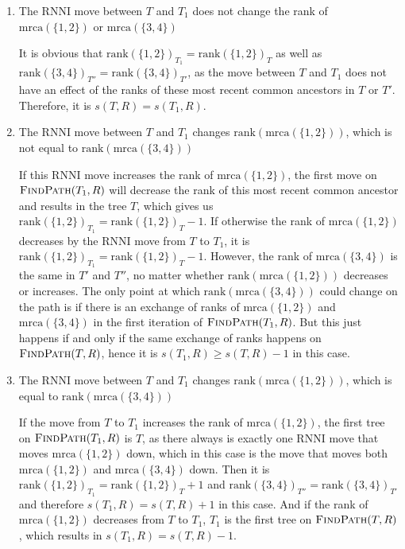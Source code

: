 \documentclass{amsart}
\newcommand{\rnni}{\mathrm{RNNI}}
\newcommand{\findpath}{\textsc{FindPath}}
\newcommand{\mrca}{\mathrm{mrca}}
\newcommand{\rank}{\mathrm{rank}}
\begin{document}
\begin{enumerate}

    \item The $\rnni$ move between $T$ and $T_1$ does not change the rank of $\mrca(\{1,2\})$ or $\mrca(\{3,4\})$

    It is obvious that $\rank(\{1,2\})_{T_1} = \rank(\{1,2\})_{T}$ as well as $\rank(\{3,4\})_{T''} = \rank(\{3,4\})_{T'}$, as the move between $T$ and $T_1$ does not have an effect of the ranks of these most recent common ancestors in $T$ or $T'$.
    Therefore, it is $s(T, R) = s(T_1,R)$.

    \item The $\rnni$ move between $T$ and $T_1$ changes $\rank(\mrca(\{1,2\}))$, which is not equal to $\rank(\mrca(\{3,4\}))$

    If this $\rnni$ move increases the rank of $\mrca(\{1,2\})$, the first move on $\findpath(T_1,R)$ will decrease the rank of this most recent common ancestor and results in the tree $T$, which gives us $\rank(\{1,2\})_{T_1} = \rank(\{1,2\})_{T} - 1$.
    If otherwise the rank of $\mrca(\{1,2\})$ decreases by the $\rnni$ move from $T$ to $T_1$, it is $\rank(\{1,2\})_{T_1} = \rank(\{1,2\})_T - 1$.
    However, the rank of $\mrca(\{3,4\})$ is the same in $T'$ and $T''$, no matter whether $\rank(\mrca(\{1,2\}))$ decreases or increases.
    The only point at which $\rank(\mrca(\{3,4\}))$ could change on the path is if there is an exchange of ranks of $\mrca(\{1,2\})$ and $\mrca(\{3,4\})$ in the first iteration of $\findpath(T_1,R)$.
    But this just happens if and only if the same exchange of ranks happens on $\findpath(T,R)$, hence it is $s(T_1,R) \geq s(T,R) - 1$ in this case.

    \item The $\rnni$ move between $T$ and $T_1$ changes $\rank(\mrca(\{1,2\}))$, which is equal to $\rank(\mrca(\{3,4\}))$

    If the move from $T$ to $T_1$ increases the rank of $\mrca(\{1,2\})$, the first tree on $\findpath(T_1,R)$ is $T$, as there always is exactly one $\rnni$ move that moves $\mrca(\{1,2\})$ down, which in this case is the move that moves both $\mrca(\{1,2\})$ and $\mrca(\{3,4\})$ down.
    Then it is $\rank(\{1,2\})_{T_1} = \rank(\{1,2\})_{T} + 1$ and $\rank(\{3,4\})_{T''} = \rank(\{3,4\})_{T'}$ and therefore $s(T_1,R) = s(T,R) + 1$ in this case.
    And if the rank of $\mrca(\{1,2\})$ decreases from $T$ to $T_1$, $T_1$ is the first tree on $\findpath(T,R)$, which results in $s(T_1,R) = s(T,R) - 1$.


\end{enumerate}
\end{document}
